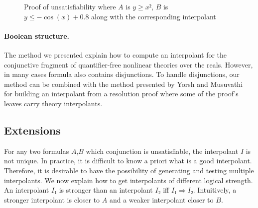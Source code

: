 \begin{example}
\begin{figure}
\caption{Proof of unsatisfiability where $A$ is $y≥x²$, $B$ is $y ≤ -\cos(x) + 0.8$ along with the corresponding interpolant}
\label{fig:proof}
\end{figure}
\end{example}

\paragraph{Boolean structure.}
The method we presented explain how to compute an interpolant for the conjunctive fragment of quantifier-free nonlinear theories over the reals.
However, in many cases formula also contains disjunctions.
To handle disjunctions, our method can be combined with the method presented by Yorsh and Musuvathi~\cite{DBLP:conf/cade/YorshM05} for building an interpolant from a resolution proof where some of the proof's leaves carry theory interpolants.




\subsection{Extensions}

For any two formulas $A$,$B$ which conjunction is unsatisfiable, the interpolant $I$ is not unique.
In practice, it is difficult to know a priori what is a good interpolant.
Therefore, it is desirable to have the possibility of generating and testing multiple interpolants.
We now explain how to get interpolants of different logical strength.
An interpolant $I₁$ is stronger than an interpolant $I₂$ iff $I₁ ⇒ I₂$.
Intuitively, a stronger interpolant is closer to $A$ and a weaker interpolant closer to $B$.

